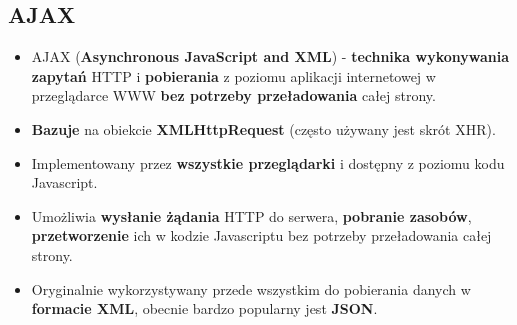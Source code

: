 \documentclass[../main.tex]{subfiles}
\begin{document}
    \subsection{AJAX}
    \begin{itemize}
        \item AJAX (\textbf{Asynchronous JavaScript and XML}) - \textbf{technika wykonywania zapytań}
        HTTP i \textbf{pobierania} z poziomu aplikacji internetowej w przeglądarce WWW \textbf{bez
        potrzeby przeładowania} całej strony.
        \item \textbf{Bazuje} na obiekcie \textbf{XMLHttpRequest} (często używany jest skrót XHR).
        \item Implementowany przez \textbf{wszystkie przeglądarki} i dostępny z poziomu kodu
        Javascript.
        \item Umożliwia \textbf{wysłanie żądania} HTTP do serwera, \textbf{pobranie zasobów},
        \textbf{przetworzenie} ich w kodzie Javascriptu bez potrzeby przeładowania całej
        strony.
        \item Oryginalnie wykorzystywany przede wszystkim do pobierania danych w
        \textbf{formacie XML}, obecnie bardzo popularny jest \textbf{JSON}.
    \end{itemize}
\end{document}
